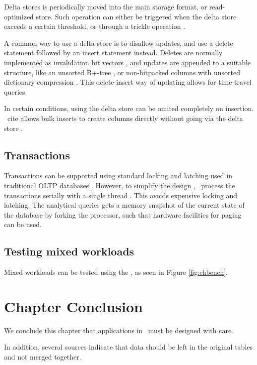 Delta stores is periodically moved into the main storage format, or read-optimized store. Such operation can either be triggered when the delta store exceeds a certain threshold, or through a trickle operation \cite{Lahiri2015-mz, Farber2012-vh}.

A common way to use a delta store is to disallow updates, and use a delete statement followed by an insert statement instead. Deletes are normally implemented as invalidation bit vectors \cite{Raman2013-em, Lamb2012-kg}, and updates are appended to a suitable structure, like an unsorted B+-tree \cite{Psaroudakis2014-ma}, or non-bitpacked columns with unsorted dictionary compression \cite{Farber2012-vh}. This delete-insert way of updating allows for time-travel queries \cite{Scwalb2014-hn, Plattner2014-fr}

In certain conditions, using the delta store can be omited completely on insertion. \mssql~cite allows bulk inserts to create columns directly without going via the delta store \cite{Larson2013-mc}.

\subsection{Transactions}
\label{sub:Transactions}
Transactions can be supported using standard locking and latching used in traditional OLTP databases \cite{Lamb2012-kg}. However, to simplify the design , \hyper~process the transactions serially with a single thread \cite{Psaroudakis2014-ma}. This avoids expensive locking and latching. The analytical queries gets a memory snapshot of the current state of the database by forking the processor, such that hardware facilities for paging can be used.

\subsection{Testing mixed workloads}
\label{sub:Testing mixed workloads}
Mixed workloads can be tested using the \chbench, as seen in Figure \ref{fig:chbench}.


\section{Chapter Conclusion}
\label{sec:Chapter Conclusion}
We conclude this chapter that applications in \bd~must be designed with care.

In addition, several sources indicate that data should be left in the original tables and not merged together.
